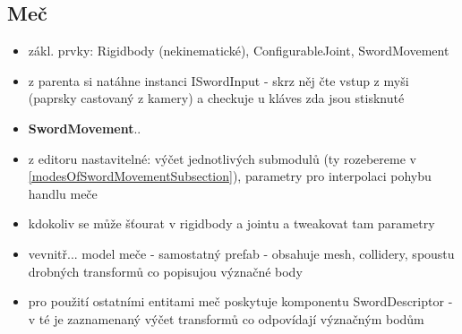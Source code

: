 \subsection{Meč}
\begin{itemize}
  \item zákl. prvky: Rigidbody (nekinematické), ConfigurableJoint, SwordMovement
  \item z parenta si natáhne instanci ISwordInput - skrz něj čte vstup z myši (paprsky castovaný z kamery) a checkuje u kláves zda jsou stisknuté
  \item \textbf{SwordMovement}..
  \item z editoru nastavitelné: výčet jednotlivých submodulů (ty rozebereme v \ref{modesOfSwordMovementSubsection}), parametry pro interpolaci pohybu handlu meče
  \item kdokoliv se může šťourat v rigidbody a jointu a tweakovat tam parametry
  \item vevnitř... model meče - samostatný prefab - obsahuje mesh, collidery, spoustu drobných transformů co popisujou význačné body
  \item pro použití ostatními entitami meč poskytuje komponentu SwordDescriptor - v té je zaznamenaný výčet transformů co odpovídají význačným bodům
  

\end{itemize}
